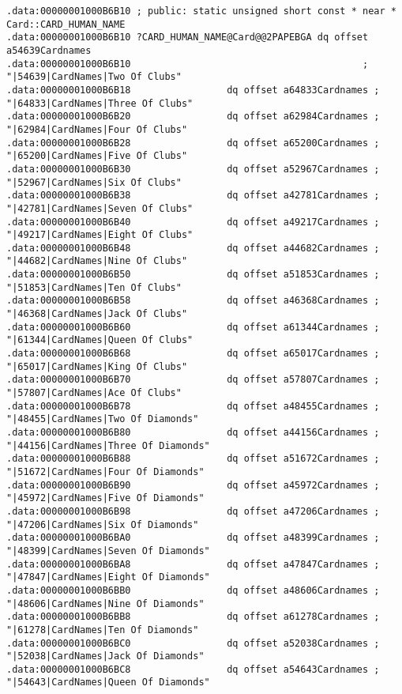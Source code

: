 \begin{lstlisting}
.data:00000001000B6B10 ; public: static unsigned short const * near * Card::CARD_HUMAN_NAME
.data:00000001000B6B10 ?CARD_HUMAN_NAME@Card@@2PAPEBGA dq offset a54639Cardnames
.data:00000001000B6B10                                         ; "|54639|CardNames|Two Of Clubs"
.data:00000001000B6B18                 dq offset a64833Cardnames ; "|64833|CardNames|Three Of Clubs"
.data:00000001000B6B20                 dq offset a62984Cardnames ; "|62984|CardNames|Four Of Clubs"
.data:00000001000B6B28                 dq offset a65200Cardnames ; "|65200|CardNames|Five Of Clubs"
.data:00000001000B6B30                 dq offset a52967Cardnames ; "|52967|CardNames|Six Of Clubs"
.data:00000001000B6B38                 dq offset a42781Cardnames ; "|42781|CardNames|Seven Of Clubs"
.data:00000001000B6B40                 dq offset a49217Cardnames ; "|49217|CardNames|Eight Of Clubs"
.data:00000001000B6B48                 dq offset a44682Cardnames ; "|44682|CardNames|Nine Of Clubs"
.data:00000001000B6B50                 dq offset a51853Cardnames ; "|51853|CardNames|Ten Of Clubs"
.data:00000001000B6B58                 dq offset a46368Cardnames ; "|46368|CardNames|Jack Of Clubs"
.data:00000001000B6B60                 dq offset a61344Cardnames ; "|61344|CardNames|Queen Of Clubs"
.data:00000001000B6B68                 dq offset a65017Cardnames ; "|65017|CardNames|King Of Clubs"
.data:00000001000B6B70                 dq offset a57807Cardnames ; "|57807|CardNames|Ace Of Clubs"
.data:00000001000B6B78                 dq offset a48455Cardnames ; "|48455|CardNames|Two Of Diamonds"
.data:00000001000B6B80                 dq offset a44156Cardnames ; "|44156|CardNames|Three Of Diamonds"
.data:00000001000B6B88                 dq offset a51672Cardnames ; "|51672|CardNames|Four Of Diamonds"
.data:00000001000B6B90                 dq offset a45972Cardnames ; "|45972|CardNames|Five Of Diamonds"
.data:00000001000B6B98                 dq offset a47206Cardnames ; "|47206|CardNames|Six Of Diamonds"
.data:00000001000B6BA0                 dq offset a48399Cardnames ; "|48399|CardNames|Seven Of Diamonds"
.data:00000001000B6BA8                 dq offset a47847Cardnames ; "|47847|CardNames|Eight Of Diamonds"
.data:00000001000B6BB0                 dq offset a48606Cardnames ; "|48606|CardNames|Nine Of Diamonds"
.data:00000001000B6BB8                 dq offset a61278Cardnames ; "|61278|CardNames|Ten Of Diamonds"
.data:00000001000B6BC0                 dq offset a52038Cardnames ; "|52038|CardNames|Jack Of Diamonds"
.data:00000001000B6BC8                 dq offset a54643Cardnames ; "|54643|CardNames|Queen Of Diamonds"

\end{lstlisting}
